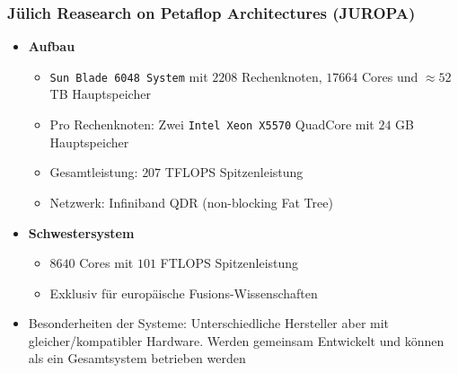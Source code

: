 \subsubsection{Jülich Reasearch on Petaflop Architectures (JUROPA)}
\begin{itemize}
	\item \textbf{Aufbau}
	\begin{itemize}
		\item \texttt{Sun Blade 6048 System} mit \(2208\) Rechenknoten, \(17664\) Cores und \(\approx 52\) TB Hauptspeicher
		\item Pro Rechenknoten: Zwei \texttt{Intel Xeon X5570} QuadCore mit \(24\) GB Hauptspeicher
		\item Gesamtleistung: \(207\) TFLOPS Spitzenleistung
		\item Netzwerk: Infiniband QDR (non-blocking Fat Tree)
	\end{itemize}
	\item \textbf{Schwestersystem}
	\begin{itemize}
		\item \(8640\) Cores mit \(101\) FTLOPS Spitzenleistung
		\item Exklusiv für europäische Fusions-Wissenschaften
	\end{itemize}
	\item Besonderheiten der Systeme: Unterschiedliche Hersteller aber mit gleicher/kompatibler Hardware. Werden gemeinsam Entwickelt und können als ein Gesamtsystem betrieben werden
\end{itemize}


